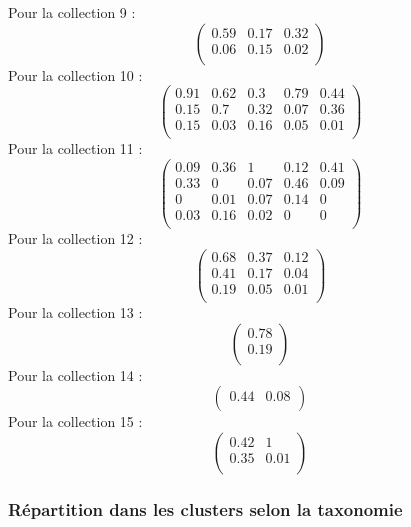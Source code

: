 Pour la collection 9 :
\[\begin{pmatrix} 0.59 &0.17 &0.32 \\0.06 &0.15 &0.02 \\ \end{pmatrix}\]
Pour la collection 10 :
\[\begin{pmatrix} 0.91 &0.62 &0.3 &0.79 &0.44 \\0.15 &0.7 &0.32 &0.07 &0.36 \\0.15 &0.03 &0.16 &0.05 &0.01 \\ \end{pmatrix}\]
Pour la collection 11 :
\[\begin{pmatrix} 0.09 &0.36 &1 &0.12 &0.41 \\0.33 &0 &0.07 &0.46 &0.09 \\0 &0.01 &0.07 &0.14 &0 \\0.03 &0.16 &0.02 &0 &0 \\ \end{pmatrix}\]
Pour la collection 12 :
\[\begin{pmatrix} 0.68 &0.37 &0.12 \\0.41 &0.17 &0.04 \\0.19 &0.05 &0.01 \\ \end{pmatrix}\]
Pour la collection 13 : \[\begin{pmatrix} 0.78 \\0.19 \\ \end{pmatrix}\]
Pour la collection 14 : \[\begin{pmatrix} 0.44 &0.08 \\ \end{pmatrix}\]
Pour la collection 15 :
\[\begin{pmatrix} 0.42 &1 \\0.35 &0.01 \\ \end{pmatrix}\]

\hypertarget{ruxe9partition-dans-les-clusters-selon-la-taxonomie-3}{%
\subsubsection{Répartition dans les clusters selon la
taxonomie}\label{ruxe9partition-dans-les-clusters-selon-la-taxonomie-3}}

